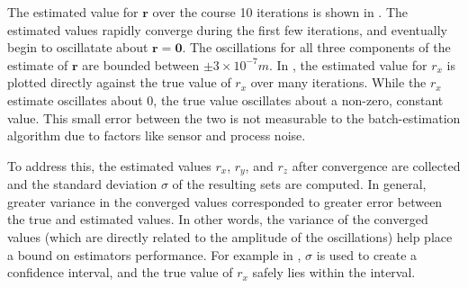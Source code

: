 The estimated value for $\bm{r}$ over the course 10 iterations is shown in . The estimated values rapidly converge during the first few iterations, and eventually begin to oscillatate about $\bm{r}=\bm{0}$. The oscillations for all three components of the estimate of $\bm{r}$ are bounded between $\pm3\times10^{-7}m$. In , the estimated value for $r_x$ is plotted directly against the true value of $r_x$ over many iterations. While the $r_x$ estimate oscillates about 0, the true value oscillates about a non-zero, constant value. This small error between the two is not measurable to the batch-estimation algorithm due to factors like sensor and process noise. 

To address this, the estimated values $r_x$, $r_y$, and $r_z$ after convergence are collected and the standard deviation $\sigma$ of the resulting sets are computed. In general, greater variance in the converged values corresponded to greater error between the true and estimated values. In other words, the variance of the converged values (which are directly related to the amplitude of the oscillations) help place a bound on estimators performance. For example in , $\sigma$ is used to create a confidence interval, and the true value of $r_x$ safely lies within the interval.

